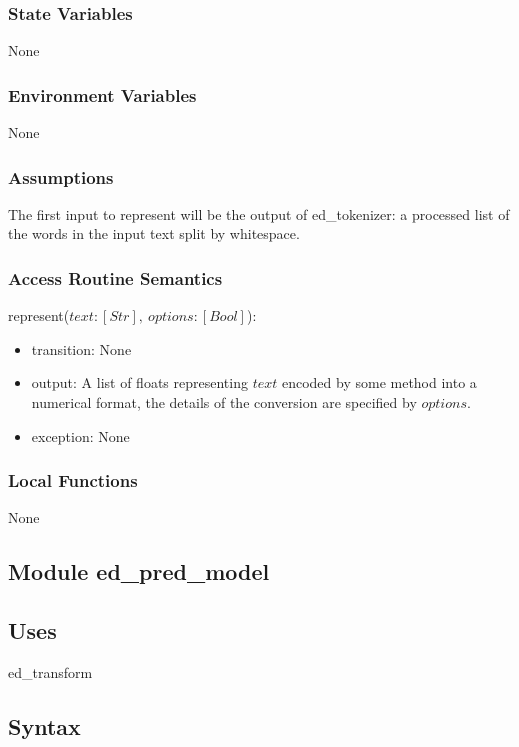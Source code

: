 \documentclass[12pt, titlepage]{article}
\begin{document}
\subsubsection{State Variables}

None

\subsubsection{Environment Variables}

None

\subsubsection{Assumptions}

The first input to represent will be the output of ed\_tokenizer: a processed list of the words in the input text split by whitespace.

\subsubsection{Access Routine Semantics}

\noindent represent($text: [Str],\ options: [Bool]$):
\begin{itemize}
\item transition: None
\item output: A list of floats representing $text$ encoded by some method into a numerical format, the details of the conversion are specified by $options$.
\item exception: None
\end{itemize}

\subsubsection{Local Functions}

None


\subsection{Module ed\_pred\_model}

\subsection{Uses}

ed\_transform

\subsection{Syntax}
\end{document}
